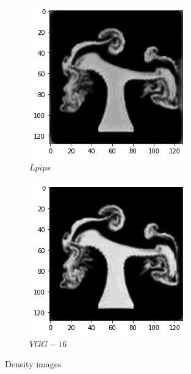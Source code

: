 \documentclass[a4paper,12pt,twoside]{report}
\begin{document}
\begin{figure}
\begin{subfigure}{0.19\textwidth}
	\end{subfigure}
	\begin{subfigure}{0.19\textwidth}
		\centering
		\includegraphics[scale=0.29]{autoencoder/lpips2.png}
		\caption{$Lpips$}
	\end{subfigure}
	\begin{subfigure}{0.19\textwidth}
		\centering
		\includegraphics[scale=0.29]{autoencoder/vgg2.png}
		\caption{$VGG-16$}
	\end{subfigure}
	\caption{Density images}
\end{figure}
\end{document}

